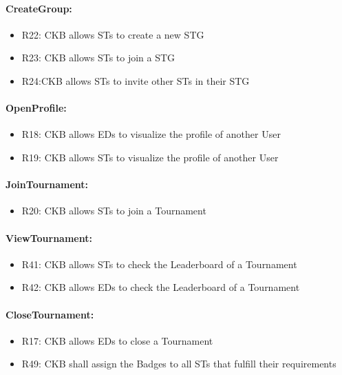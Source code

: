\paragraph{CreateGroup:}
\begin{itemize}
    \item R22: CKB allows STs to create a new STG 
    \item R23: CKB allows STs to join a STG 
    \item R24:CKB allows STs to invite other STs in their STG
\end{itemize}


\paragraph{OpenProfile:}
\begin{itemize}
    \item R18: CKB allows EDs to visualize the profile of another User 
    \item R19: CKB allows STs to visualize the profile of another User
\end{itemize}


\paragraph{JoinTournament:}
\begin{itemize}
    \item R20: CKB allows STs to join a Tournament 
\end{itemize}


\paragraph{ViewTournament:}
\begin{itemize}
    \item R41: CKB allows STs to check the Leaderboard of a Tournament 
    \item R42: CKB allows EDs to check the Leaderboard of a Tournament
\end{itemize}


\paragraph{CloseTournament:}
\begin{itemize}
    \item R17: CKB allows EDs to close a Tournament 
    \item R49: CKB shall assign the Badges to all STs that fulfill their requirements 
\end{itemize}


